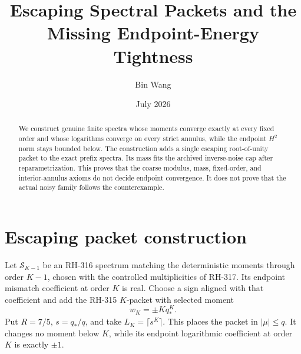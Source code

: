 \documentclass[11pt]{article}
\title{Escaping Spectral Packets and the Missing Endpoint-Energy Tightness}
\author{Bin Wang}\date{July 2026}
\theoremstyle{remark}\newtheorem{remark}[theorem]{Remark}
\begin{document}
\maketitle
\begin{abstract}
We construct genuine finite spectra whose moments converge exactly at every
fixed order and whose logarithms converge on every strict annulus, while the
endpoint $H^2$ norm stays bounded below.  The construction adds a single
escaping root-of-unity packet to the exact prefix spectra.  Its mass fits the
archived inverse-noise cap after reparametrization.  This proves that the
coarse modulus, mass, fixed-order, and interior-annulus axioms do not decide
endpoint convergence.  It does not prove that the actual noisy family follows
the counterexample.
\end{abstract}

\section{Escaping packet construction}
Let $\mathcal S_{K-1}$ be an RH-316 spectrum matching the deterministic
moments through order $K-1$, chosen with the controlled multiplicities of
RH-317.  Its endpoint mismatch coefficient at order $K$ is real.  Choose a
sign aligned with that coefficient and add the RH-315 $K$-packet with
selected moment
\[
 w_K=\pm Kq_*^K.
\]
Put $R=7/5$, $s=q_*/q$, and take $L_K=\lceil s^K\rceil$.  This places the packet in
$|\mu|\le q$.  It changes no moment below $K$, while its endpoint
logarithmic coefficient at order $K$ is exactly $\pm1$.
\end{document}
